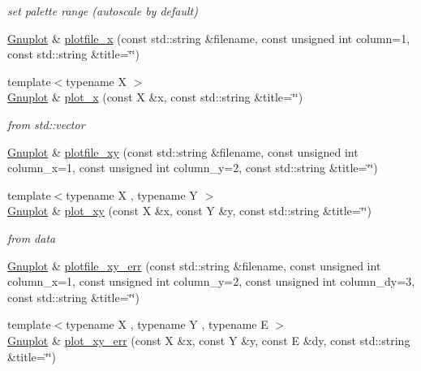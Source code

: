 \begin{DoxyCompactItemize}
\begin{DoxyCompactList}\small\item\em set palette range (autoscale by default) \end{DoxyCompactList}\item 
\hyperlink{classkukadu_1_1Gnuplot}{Gnuplot} \& \hyperlink{classkukadu_1_1Gnuplot_a6f7bb713dd84b3ad5a737f7005411bfc}{plotfile\+\_\+x} (const std\+::string \&filename, const unsigned int column=1, const std\+::string \&title=\char`\"{}\char`\"{})
\item 
{\footnotesize template$<$typename X $>$ }\\\hyperlink{classkukadu_1_1Gnuplot}{Gnuplot} \& \hyperlink{classkukadu_1_1Gnuplot_af942480ea37a33cbd5bef00e8592404d}{plot\+\_\+x} (const X \&x, const std\+::string \&title=\char`\"{}\char`\"{})
\begin{DoxyCompactList}\small\item\em from std\+::vector \end{DoxyCompactList}\item 
\hyperlink{classkukadu_1_1Gnuplot}{Gnuplot} \& \hyperlink{classkukadu_1_1Gnuplot_a69a964c20551ba369846d10c74e53d51}{plotfile\+\_\+xy} (const std\+::string \&filename, const unsigned int column\+\_\+x=1, const unsigned int column\+\_\+y=2, const std\+::string \&title=\char`\"{}\char`\"{})
\item 
{\footnotesize template$<$typename X , typename Y $>$ }\\\hyperlink{classkukadu_1_1Gnuplot}{Gnuplot} \& \hyperlink{classkukadu_1_1Gnuplot_ac80122ec909d18c1c1b22bd7c3570fb9}{plot\+\_\+xy} (const X \&x, const Y \&y, const std\+::string \&title=\char`\"{}\char`\"{})
\begin{DoxyCompactList}\small\item\em from data \end{DoxyCompactList}\item 
\hyperlink{classkukadu_1_1Gnuplot}{Gnuplot} \& \hyperlink{classkukadu_1_1Gnuplot_a78fb33f6b8f7c169bad61f7767b4452f}{plotfile\+\_\+xy\+\_\+err} (const std\+::string \&filename, const unsigned int column\+\_\+x=1, const unsigned int column\+\_\+y=2, const unsigned int column\+\_\+dy=3, const std\+::string \&title=\char`\"{}\char`\"{})
\item 
{\footnotesize template$<$typename X , typename Y , typename E $>$ }\\\hyperlink{classkukadu_1_1Gnuplot}{Gnuplot} \& \hyperlink{classkukadu_1_1Gnuplot_a4cc62bb2504de6635ed6b47cbaf02c1c}{plot\+\_\+xy\+\_\+err} (const X \&x, const Y \&y, const E \&dy, const std\+::string \&title=\char`\"{}\char`\"{})

\end{DoxyCompactItemize}
